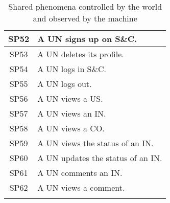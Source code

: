 \begin{longtable}{|c|p{10.5cm}|}
    SP52 & A UN signs up on S\&C. \\ \hline
    SP53 & A UN deletes its profile. \\ \hline
    SP54 & A UN logs in S\&C. \\ \hline
    SP55 & A UN logs out. \\ \hline
    SP56 & A UN views a US. \\ \hline
    SP57 & A UN views an IN. \\ \hline
    SP58 & A UN views a CO. \\ \hline
    SP59 & A UN views the status of an IN. \\ \hline
    SP60 & A UN updates the status of an IN. \\ \hline
    SP61 & A UN comments an IN. \\ \hline
    SP62 & A UN views a comment. \\ \hline
\caption{Shared phenomena controlled by the world and observed by the machine}
\end{longtable}

